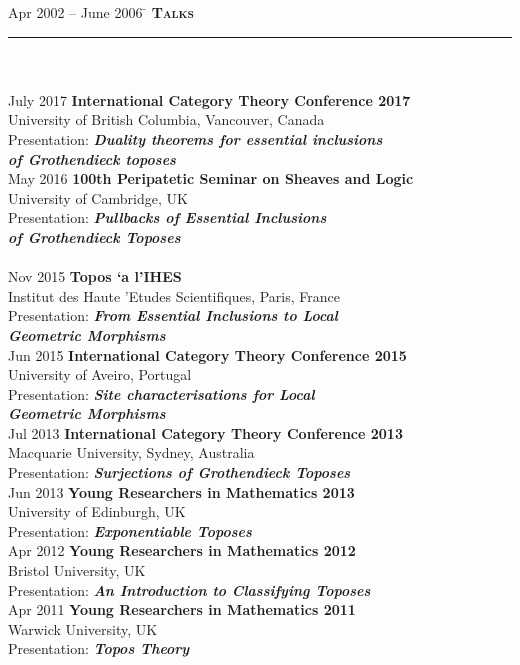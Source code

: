 \documentclass[11pt,a4paper]{article}
\begin{document}
\begin{tabbing}
Apr 2002 -- June 2006 \=\kill
\> \textbf{\Large{\textsc{Talks}}} \\
\> \noindent\rule{11cm}{1pt}\\
\> \\
\> July 2017 \' \textbf{International Category Theory Conference 2017}\\ 
\> University of British Columbia, Vancouver, Canada\\
\> Presentation: \textbf{\textit{Duality theorems for essential inclusions}} \\ \> \textbf{\textit{of Grothendieck toposes}}\\ [1mm] 
\> May 2016 \' \textbf{100th Peripatetic Seminar on Sheaves and Logic } \\
\> University of Cambridge, UK \\
\> Presentation: \textbf{\textit{Pullbacks of Essential Inclusions}} \\ \> \textbf{\textit{of Grothendieck Toposes}} \\[1mm]
\\
\> Nov 2015 \' \textbf{Topos \a`a l'IHES} \\ 
\> Institut des Haute \a'Etudes Scientifiques, Paris, France\\
\> Presentation: \textbf{\textit{From Essential Inclusions to Local}} \\ \> \textbf{\textit{Geometric Morphisms}}\\[1mm]
\> Jun 2015 \' \textbf{International Category Theory Conference 2015}\\ 
\> University of Aveiro, Portugal\\
\> Presentation: \textbf{\textit{Site characterisations for Local}} \\ \> \textbf{\textit{Geometric Morphisms}}\\ [1mm] 
\> Jul 2013 \' \textbf{International Category Theory Conference 2013}\\
\> Macquarie University, Sydney, Australia\\ 
\> Presentation: \textbf{\textit{Surjections of Grothendieck Toposes}}\\ [1mm]
\>Jun 2013 \' \textbf{Young Researchers in Mathematics 2013}\\
\> University of Edinburgh, UK\\
\>Presentation:
 \textbf{\textit{Exponentiable Toposes}}\\[1mm]
\>Apr 2012 \' \textbf{Young Researchers in Mathematics 2012}\\ 
\>Bristol University, UK \\
\>Presentation:
 \textbf{\textit{An Introduction to Classifying Toposes}}\\[1mm]
\> Apr 2011 \' \textbf{Young Researchers in Mathematics 2011}\\ 
\> Warwick University, UK\\
\>Presentation:
 \textbf{\textit{Topos Theory}}\\[1mm]
\end {tabbing}
\end{document}

